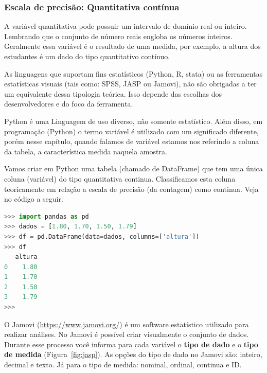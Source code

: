 \documentclass[a4paper,12pt]{book}
\begin{document}
\subsubsection{Escala de precisão: Quantitativa contínua}

A  variável quantitativa pode possuir um intervalo de domínio real ou inteiro. Lembrando que o conjunto de número reais engloba os números inteiros. Geralmente essa variável é o resultado de uma medida, por exemplo, a altura dos estudantes é um dado do tipo quantitativo contínuo.

As linguagens que suportam fins estatísticos (Python, R, stata) ou as ferramentas estatísticas visuais (tais como: SPSS, JASP ou Jamovi), não são obrigadas a ter um equivalente dessa tipologia teórica. Isso depende das escolhas dos desenvolvedores e do foco da ferramenta.

Python é uma Linguagem de uso diverso, não somente estatístico. Além disso, em programação (Python) o termo variável é utilizado com um significado diferente, porém nesse capítulo, quando falamos de variável estamos nos referindo a coluna da tabela, a característica medida naquela amostra.

Vamos criar em Python uma tabela (chamado de DataFrame) que tem uma única coluna (variável) do tipo quantitativa continua. Classificamos esta coluna teoricamente em relação a escala de precisão (da contagem) como continua. Veja no código a seguir.

\begin{lstlisting}[language=Python, caption={Código que cria e exibe uma tabela em Python com uma coluna. A classificação teórica dessa variável é quantitativa continua.}]
>>> import pandas as pd
>>> dados = [1.80, 1.70, 1.50, 1.79]
>>> df = pd.DataFrame(data=dados, columns=['altura'])
>>> df
   altura
0    1.80
1    1.70
2    1.50
3    1.79
>>>
\end{lstlisting}

O Jamovi (\url{https://www.jamovi.org/}) é um software estatístico utilizado para realizar análises. No Jamovi é possível criar visualmente o conjunto de dados. Durante esse processo você informa para cada variável o \textbf{tipo de dado} e o \textbf{tipo de medida} (Figura~\ref{fig:jasp}). As opções do tipo de dado no Jamovi são: inteiro, decimal e texto. Já para o tipo de medida: nominal, ordinal, continua e ID.
\end{document}
